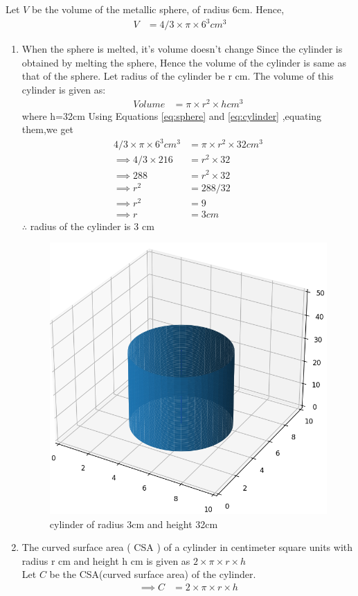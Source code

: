 \documentclass[journal,12pt,twocolumn]{IEEEtran}
\begin{document}
	Let $V$ be the volume of the metallic sphere, of radius 6cm. 
	Hence,
	\begin{align} V&=4/3 \times \pi \times 6^3 cm^3 
		\label{eq:sphere}
	\end{align} 
	\begin{enumerate}[label=(\roman*)]
		\item When the sphere is melted, it's volume doesn't change
		Since the cylinder is obtained by melting the sphere, Hence the volume of the cylinder is same as that of the sphere.
		Let radius of the cylinder be r cm.
		The volume of this cylinder is given as: 
		\begin{align} 
		Volume &= \pi \times r^2 \times h cm^3
			\label{eq:cylinder}
		\end{align}
		where h=32cm
		Using Equations 
		\eqref{eq:sphere} and 
		\eqref{eq:cylinder} 
		,equating them,we get 
		\begin{align}
		4/3 \times \pi \times 6^3 cm^3&=\pi \times r^2 \times 32 cm^3
			\\
		\implies 4/3 \times 216&=r^2 \times 32
			\\
		\implies 288&= r^2 \times 32
			\\
		\implies r^2&= 288/32
			\\
		\implies r^2&=9
			\\
		\implies r&=3cm
		\end{align} 
	$\therefore$  radius of the  cylinder is 3 cm
		
		\begin{figure}[h!]
			\centering
			\includegraphics[width=0.5\columnwidth]{figs/fig_cylinder.png}
			\caption{cylinder of radius 3cm and height 32cm}
			\label{cylinder}
		\end{figure}
		\item The curved surface area ( CSA ) of a cylinder in centimeter square units with radius r cm and height h cm is given as
		$ 2 \times \pi \times r \times h $
		\\
		Let $C$ be the CSA(curved surface area) of the cylinder.
		\begin{align}	
		\implies C&=2 \times \pi \times r \times h
		\end{align}
		

\end{enumerate}
\end{document}
